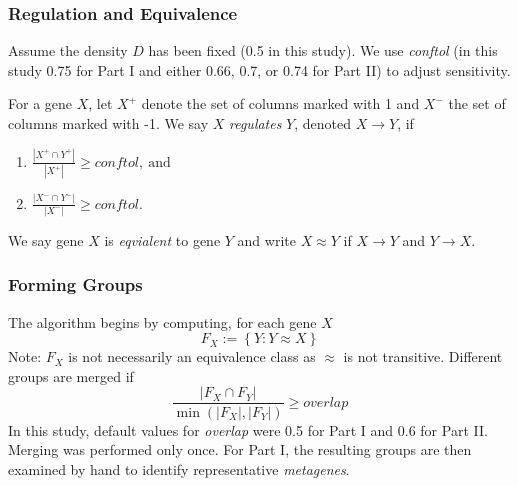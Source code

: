 \documentclass[
	11pt, %
]{beamer}
\begin{document}
\begin{frame}
	\frametitle{Regulation and Equivalence}
    
    Assume the density $D$ has been fixed (0.5 in this study). We use \emph{conftol} (in this study 0.75 for Part I and either 0.66, 0.7, or 0.74 for Part II) to adjust sensitivity.
    
    \bigskip
    \pause
    \begin{definition}
        For a gene $X$, let $X^{+}$ denote the set of columns marked with 1 and $X^{-}$ the set of columns marked with -1. We say $X$ \emph{regulates} $Y$, denoted $X \rightarrow Y$, if
        \begin{enumerate}
            \item $\frac{\left| X^{+} \cap Y^{+} \right|}{\left| X^{+} \right|} \geq conftol,\ \mathrm{and}$
            \item $\frac{\left| X^{-} \cap Y^{-} \right|}{\left| X^{-} \right|} \geq conftol.$
        \end{enumerate}
    \end{definition}
    \pause
    \begin{definition}
        We say gene $X$ is \emph{eqvialent} to gene $Y$ and write $X \approx Y$ if $X \rightarrow Y$ and $Y \rightarrow X$.
    \end{definition}
\end{frame}

\begin{frame}
	\frametitle{Forming Groups}

    The algorithm begins by computing, for each gene $X$
    \begin{equation*}
        F_X := \left\{ Y : Y \approx X \right\}
    \end{equation*}
    \pause
    Note: $F_X$ is not necessarily an equivalence class as $\approx$ is not transitive. Different groups are merged if
    \begin{equation*}
        \frac{\left| F_X \cap F_Y \right|}{\min(\left| F_X \right|, \left| F_Y \right|)} \geq overlap
    \end{equation*}
    \pause
    In this study, default values for \emph{overlap} were 0.5 for Part I and 0.6 for Part II. Merging was performed only once. For Part I, the resulting groups are then examined by hand to identify representative \emph{metagenes}.
\end{frame}
\end{document}
